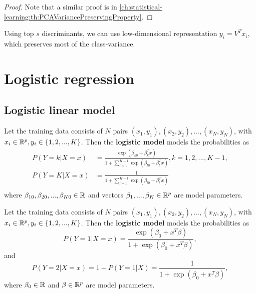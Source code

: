 \begin{refsection}
\begin{proof}
	Note that a similar proof is in \autoref{ch:statistical-learning:th:PCAVariancePreservingProperty}. 
\end{proof}


\begin{remark}
	Using top $s$ discriminants, we can use low-dimensional representation $y_i = V^Tx_i$, which preserves most of the class-variance.
\end{remark}

\section{Logistic regression}


\subsection{Logistic linear model}


\begin{definition}
	Let the training data consists of $N$ pairs $(x_1,y_1),(x_2,y_2),...,(x_N,y_N)$, with $x_i \in \mathbb{R}^{p}, y_i \in \{1,2,...,K\}$. Then the \textbf{logistic model} models the probabilities as
	\begin{align*}
	P(Y = k|X=x) &= \frac{\exp(\beta_{k0} + \beta_k^Tx)}{1 + \sum_{l=1}^{K-1}\exp(\beta_{l0}+\beta_l^Tx)}, k=1,2,...,K-1, \\
	P(Y = K|X=x) &= \frac{1}{1 + \sum_{l=1}^{K-1}\exp(\beta_{l0}+\beta_l^Tx)} \\
	\end{align*}
	where $\beta_{10},\beta_{20},...,\beta_{K0} \in \mathbb{R}$ and vectors $\beta_1,...,\beta_K\in\mathbb{R}^p$ are model parameters.
\end{definition}


\begin{definition}
	Let the training data consists of $N$ pairs $(x_1,y_1),(x_2,y_2),...,(x_N,y_N)$, with $x_i \in \mathbb{R}^{p}, y_i \in \{1,2,...,K\}$. Then the \textbf{logistic model} models the probabilities as
	$$P(Y=1|X=x) = \frac{\exp(\beta_0 + x^T\beta)}{1 + \exp(\beta_0 + x^T\beta)},$$
	and
	$$P(Y=2|X=x) = 1- P(Y=1|X) = \frac{1}{1 + \exp(\beta_0 + x^T\beta)},$$ 
	where $\beta_0 \in \mathbb{R}$ and $\beta\in\mathbb{R}^p$ are model parameters.
\end{definition}



\end{refsection}
